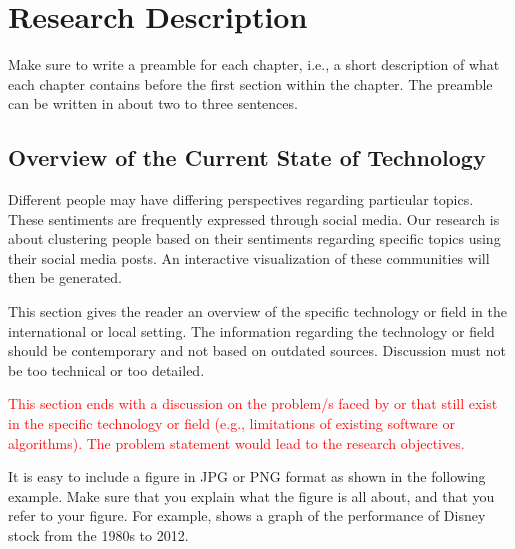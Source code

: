 %
%
%                 

\chapter{Research Description}
\label{sec:researchdesc}    %

Make sure to write a preamble for each chapter, i.e., a short description of what each chapter contains before 
the first section within the chapter.  The preamble can be written in about two to three sentences.

\section{Overview of the Current State of Technology}
\label{sec:overview}

%
%

Different people may have differing perspectives regarding particular topics. These sentiments
are frequently expressed through social media. Our research is about 
clustering people based on their sentiments regarding specific topics using their social media posts.
An interactive visualization of these communities will then be generated.

This section gives the reader an overview of the specific technology or field in the international or
local setting. The information regarding the technology or field should be contemporary and not
based on outdated sources. Discussion must not be too technical or too detailed.
   
\textcolor{red}{This section ends with a discussion on the problem/s faced by or that still exist in the specific
technology or field (e.g., limitations of existing software or algorithms). The problem statement
would lead to the research objectives.}


It is   easy to include a figure in JPG or PNG format as shown in the 
following example.  Make sure that you explain what the figure is all about,
and that you refer to your figure.  For example,  shows a graph of the performance of Disney stock from the 1980s to 2012.
  
